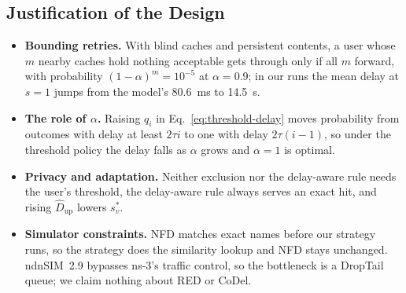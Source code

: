 \documentclass[11pt,a4paper]{article}
\newcommand{\Dup}{\widehat{D}_{\mathrm{up}}}
\begin{document}
\subsection{Justification of the Design}\label{sec:justify}
\begin{itemize}
  \item \textbf{Bounding retries.} With blind caches and persistent contents, a user whose $m$
        nearby caches hold nothing acceptable gets through only if all $m$ forward, with probability
        $(1-\alpha)^m=10^{-5}$ at $\alpha=0.9$; in our runs the mean delay at $s=1$ jumps from the
        model's 80.6~ms to 14.5~s.
  \item \textbf{The role of $\alpha$.} Raising $q_i$ in Eq.~\eqref{eq:threshold-delay} moves
        probability from outcomes with delay at least $2\tau i$ to one with delay $2\tau(i-1)$, so
        under the threshold policy the delay falls as $\alpha$ grows and $\alpha=1$ is optimal.
  \item \textbf{Privacy and adaptation.} Neither exclusion nor the delay-aware rule needs the user's
        threshold, the delay-aware rule always serves an exact hit, and rising $\Dup$ lowers $s_v^*$.
  \item \textbf{Simulator constraints.} NFD matches exact names before our strategy runs, so the
        strategy does the similarity lookup and NFD stays unchanged. ndnSIM~2.9 bypasses ns-3's
        traffic control, so the bottleneck is a DropTail queue; we claim nothing about RED or CoDel.
\end{itemize}
\end{document}

